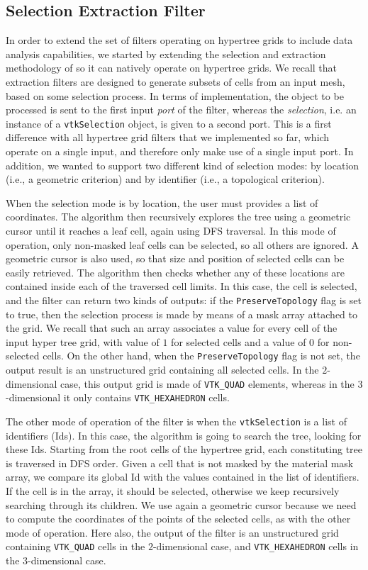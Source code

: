 \subsection{Selection Extraction Filter}
\label{s:extract-selected-filters}
In order to extend the set of filters operating on hypertree
grids to include data analysis capabilities, we started by
extending the selection and extraction methodology of \VTK{} so it can
natively operate on hypertree grids.
We recall that extraction filters are designed to generate subsets
of cells from an input mesh, based on some selection process.
In terms of implementation, the object to be processed is sent to the
first input \emph{port} of the filter, whereas the \emph{selection},
i.e. an instance of a \texttt{vtkSelection} object, is given to a
second port.
This is a first difference with all hypertree grid  filters that we
implemented so far, which operate on a single input, and therefore
only make use of a single input port.
In addition, we wanted to support two different kind of selection modes:
by location (i.e., a geometric criterion) and by identifier (i.e., a
topological criterion).

When the selection mode is by location, the user must provides a list of
coordinates.
The algorithm then recursively explores the tree using a geometric
cursor until it reaches a leaf cell, again using DFS traversal.
In this mode of operation, only non-masked leaf cells can  be
selected, so all others are ignored.
A geometric cursor is also used, so that size and position of
selected cells can be easily retrieved.
The algorithm then checks whether any of these locations are
contained inside each of the traversed cell limits.
In this case, the cell is selected, and  the filter can return two
kinds of outputs: if the \texttt{PreserveTopology} flag is set to
true, then the selection process is made by means of a mask array
attached to the grid.
We recall that such an array associates a value for every cell of the
input hyper tree grid, with value of $1$ for selected cells and a
value of $0$ for non-selected cells. 
On the other hand, when the \texttt{PreserveTopology} flag is not set,
the output result is an unstructured grid containing all selected
cells. 
In the $2$-dimensional case, this output grid is made of
\texttt{VTK\_QUAD} elements, whereas in the $3$-dimensional it only contains
\texttt{VTK\_HEXAHEDRON} cells.

The other mode of operation of the filter is when the
\texttt{vtkSelection} is a list of identifiers (Ids).
In this case, the algorithm is going to search the tree, looking for
these Ids.
Starting from the root cells of the hypertree grid, each constituting
tree is traversed in DFS order.
Given a cell that is not masked by the material mask array, we compare
its global Id with the values contained in the list of identifiers.
If the cell is in the array, it should be selected, otherwise we
keep recursively searching through its children.
We use again a geometric cursor because we need to compute the
coordinates of the points of the selected cells, as with the other
mode of operation.
Here also, the output of the filter is an unstructured grid containing
\texttt{VTK\_QUAD} cells in the $2$-dimensional case, and
\texttt{VTK\_HEXAHEDRON} cells in the $3$-dimensional case.
